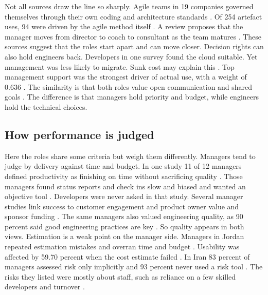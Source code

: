 \documentclass[conference]{IEEEtran}
\begin{document}
Not all sources draw the line so sharply. Agile teams in 19 companies governed themselves through their own coding and architecture standards \cite{wagenaar2018}. Of 254 artefact uses, 94 were driven by the agile method itself \cite{wagenaar2018}. A review proposes that the manager moves from director to coach to consultant as the team matures \cite{kalluri2025}. These sources suggest that the roles start apart and can move closer. Decision rights can also hold engineers back. Developers in one survey found the cloud suitable. Yet management was less likely to migrate. Sunk cost may explain this \cite{pisirir2023}. Top management support was the strongest driver of actual use, with a weight of 0.636 \cite{pisirir2023}. The similarity is that both roles value open communication and shared goals \cite{nguyen2016b,amorim2020}. The difference is that managers hold priority and budget, while engineers hold the technical choices.

\subsection{How performance is judged}

Here the roles share some criteria but weigh them differently. Managers tend to judge by delivery against time and budget. In one study 11 of 12 managers defined productivity as finishing on time without sacrificing quality \cite{suwarno2025}. Those managers found status reports and check ins slow and biased and wanted an objective tool \cite{suwarno2025}. Developers were never asked in that study. Several manager studies link success to customer engagement and product owner value and sponsor funding \cite{nguyen2016a,nguyen2016b}. The same managers also valued engineering quality, as 90 percent said good engineering practices are key \cite{nguyen2016a}. So quality appears in both views. Estimation is a weak point on the manager side. Managers in Jordan repeated estimation mistakes and overran time and budget \cite{tarawneh2018}. Usability was affected by 59.70 percent when the cost estimate failed \cite{tarawneh2018}. In Iran 83 percent of managers assessed risk only implicitly and 93 percent never used a risk tool \cite{afshari2018}. The risks they listed were mostly about staff, such as reliance on a few skilled developers and turnover \cite{afshari2018}.
\end{document}
